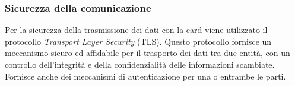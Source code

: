 






\subsubsection{Sicurezza della comunicazione}
\label{tls}
Per la sicurezza della trasmissione dei dati con la card viene utilizzato il protocollo \textit{Transport Layer Security}  (TLS). Questo protocollo fornisce un meccanismo sicuro ed affidabile per il trasporto dei dati tra due entità, con un controllo dell'integrità e della confidenzialità delle informazioni scambiate. Fornisce anche dei meccanismi di autenticazione per una o entrambe le parti.

